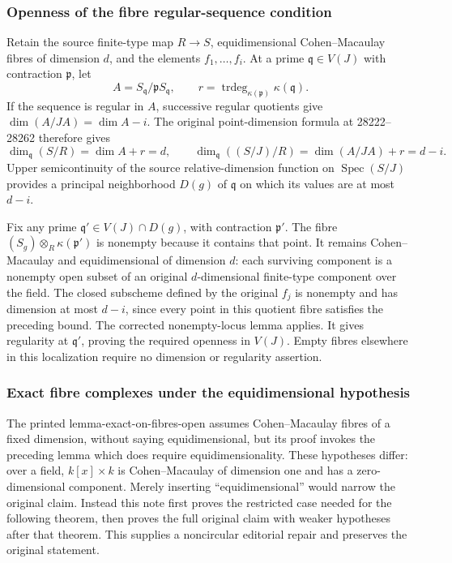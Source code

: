 \subsubsection{Openness of the fibre regular-sequence condition}\label{openness-of-the-fibre-regular-sequence-condition}

Retain the source finite-type map \(R\to S\), equidimensional Cohen--Macaulay fibres of dimension \(d\), and the elements \(f_1,\ldots,f_i\). At a prime \(\mathfrak q\in V(J)\) with contraction \(\mathfrak p\), let \[
A=S_{\mathfrak q}/\mathfrak pS_{\mathfrak q},\qquad
r=\operatorname{trdeg}_{\kappa(\mathfrak p)}\kappa(\mathfrak q).
\] If the sequence is regular in \(A\), successive regular quotients give \(\dim(A/JA)=\dim A-i\). The original point-dimension formula at 28222--28262 therefore gives \[
\dim_{\mathfrak q}(S/R)=\dim A+r=d,\qquad
\dim_{\mathfrak q}((S/J)/R)=\dim(A/JA)+r=d-i.
\] Upper semicontinuity of the source relative-dimension function on \(\operatorname{Spec}(S/J)\) provides a principal neighborhood \(D(g)\) of \(\mathfrak q\) on which its values are at most \(d-i\).

Fix any prime \(\mathfrak q'\in V(J)\cap D(g)\), with contraction \(\mathfrak p'\). The fibre \((S_g)\otimes_R\kappa(\mathfrak p')\) is nonempty because it contains that point. It remains Cohen--Macaulay and equidimensional of dimension \(d\): each surviving component is a nonempty open subset of an original \(d\)-dimensional finite-type component over the field. The closed subscheme defined by the original \(f_j\) is nonempty and has dimension at most \(d-i\), since every point in this quotient fibre satisfies the preceding bound. The corrected nonempty-locus lemma applies. It gives regularity at \(\mathfrak q'\), proving the required openness in \(V(J)\). Empty fibres elsewhere in this localization require no dimension or regularity assertion.

\subsubsection{Exact fibre complexes under the equidimensional hypothesis}\label{exact-fibre-complexes-under-the-equidimensional-hypothesis}

The printed lemma-exact-on-fibres-open assumes Cohen--Macaulay fibres of a fixed dimension, without saying equidimensional, but its proof invokes the preceding lemma which does require equidimensionality. These hypotheses differ: over a field, \(k[x]\times k\) is Cohen--Macaulay of dimension one and has a zero-dimensional component. Merely inserting ``equidimensional'' would narrow the original claim. Instead this note first proves the restricted case needed for the following theorem, then proves the full original claim with weaker hypotheses after that theorem. This supplies a noncircular editorial repair and preserves the original statement.


